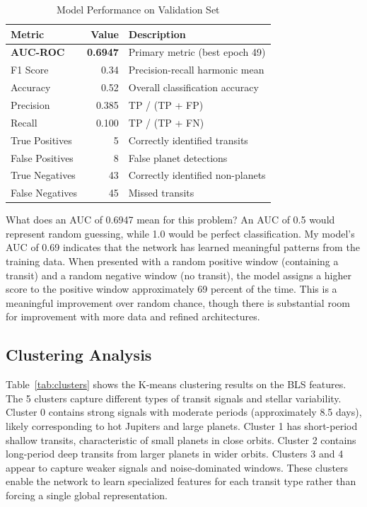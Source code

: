 \documentclass[letterpaper]{article}
\begin{document}
\begin{table}[h]
\centering
\caption{Model Performance on Validation Set}
\label{tab:performance}
\begin{tabular}{@{}lrl@{}}
\toprule
\textbf{Metric} & \textbf{Value} & \textbf{Description} \\
\midrule
\textbf{AUC-ROC} & \textbf{0.6947} & Primary metric (best epoch 49) \\
F1 Score & 0.34 & Precision-recall harmonic mean \\
Accuracy & 0.52 & Overall classification accuracy \\
Precision & 0.385 & TP / (TP + FP) \\
Recall & 0.100 & TP / (TP + FN) \\
True Positives & 5 & Correctly identified transits \\
False Positives & 8 & False planet detections \\
True Negatives & 43 & Correctly identified non-planets \\
False Negatives & 45 & Missed transits \\
\bottomrule
\end{tabular}
\end{table}

What does an AUC of 0.6947 mean for this problem? An AUC of 0.5 would represent random guessing, while 1.0 would be perfect classification. My model's AUC of 0.69 indicates that the network has learned meaningful patterns from the training data. When presented with a random positive window (containing a transit) and a random negative window (no transit), the model assigns a higher score to the positive window approximately 69 percent of the time. This is a meaningful improvement over random chance, though there is substantial room for improvement with more data and refined architectures.

\subsection{Clustering Analysis}

Table~\ref{tab:clusters} shows the K-means clustering results on the BLS features. The 5 clusters capture different types of transit signals and stellar variability. Cluster 0 contains strong signals with moderate periods (approximately 8.5 days), likely corresponding to hot Jupiters and large planets. Cluster 1 has short-period shallow transits, characteristic of small planets in close orbits. Cluster 2 contains long-period deep transits from larger planets in wider orbits. Clusters 3 and 4 appear to capture weaker signals and noise-dominated windows. These clusters enable the network to learn specialized features for each transit type rather than forcing a single global representation.
\end{document}
